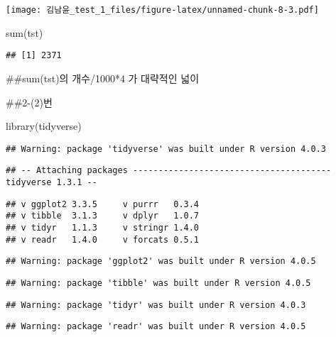 \documentclass[
  12pt,
]{article}
\newenvironment{Shaded}{\begin{snugshade}}{\end{snugshade}}
\newcommand{\FunctionTok}[1]{\textcolor[rgb]{0.00,0.00,0.00}{#1}}
\newcommand{\NormalTok}[1]{#1}
\begin{document}
\texttt{[image: 김남윤\_test\_1\_files/figure-latex/unnamed-chunk-8-3.pdf]}

\begin{Shaded}
\begin{Highlighting}[]
\FunctionTok{sum}\NormalTok{(tst)}
\end{Highlighting}
\end{Shaded}

\begin{verbatim}
## [1] 2371
\end{verbatim}

\#\#sum(tst)의 개수/1000*4 가 대략적인 넓이

\#\#2-(2)번

\begin{Shaded}
\begin{Highlighting}[]
\FunctionTok{library}\NormalTok{(tidyverse)}
\end{Highlighting}
\end{Shaded}

\begin{verbatim}
## Warning: package 'tidyverse' was built under R version 4.0.3
\end{verbatim}

\begin{verbatim}
## -- Attaching packages --------------------------------------- tidyverse 1.3.1 --
\end{verbatim}

\begin{verbatim}
## v ggplot2 3.3.5     v purrr   0.3.4
## v tibble  3.1.3     v dplyr   1.0.7
## v tidyr   1.1.3     v stringr 1.4.0
## v readr   1.4.0     v forcats 0.5.1
\end{verbatim}

\begin{verbatim}
## Warning: package 'ggplot2' was built under R version 4.0.5
\end{verbatim}

\begin{verbatim}
## Warning: package 'tibble' was built under R version 4.0.5
\end{verbatim}

\begin{verbatim}
## Warning: package 'tidyr' was built under R version 4.0.3
\end{verbatim}

\begin{verbatim}
## Warning: package 'readr' was built under R version 4.0.5
\end{verbatim}
\end{document}
